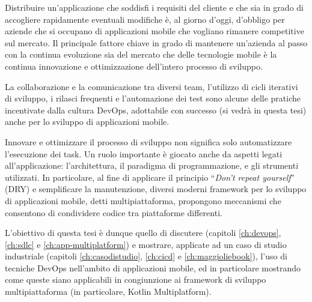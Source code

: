 
Distribuire un'applicazione che soddisfi i requisiti del cliente e che sia in grado di accogliere rapidamente eventuali modifiche è, 
al giorno d’oggi, 
d'obbligo per aziende che si occupano di applicazioni mobile che vogliano rimanere competitive sul mercato.
Il principale fattore chiave in grado di mantenere un'azienda al passo con la continua evoluzione sia del mercato che delle tecnologie mobile è la continua innovazione e ottimizzazione dell'intero processo di sviluppo.

La collaborazione e la comunicazione tra diversi team, 
l'utilizzo di cicli iterativi di sviluppo, 
i rilasci frequenti e l'automazione dei test sono alcune delle pratiche incentivate dalla cultura DevOps, 
adottabile con successo (si vedrà in questa tesi) anche per lo sviluppo di applicazioni mobile.

Innovare e ottimizzare il processo di sviluppo non significa solo automatizzare l'esecuzione dei task.
Un ruolo importante è giocato anche da aspetti legati all'applicazione:
l'architettura,
il paradigma di programmazione,
e gli strumenti utilizzati.
In particolare,
al fine di applicare il principio ``\textit{Don't repeat yourself}'' (DRY) e semplificare la manutenzione,
diversi moderni framework per lo sviluppo di applicazioni mobile,
detti multipiattaforma, 
propongono meccanismi che consentono di condividere codice tra piattaforme differenti.

L'obiettivo di questa tesi è dunque quello di discutere
(capitoli \ref{ch:devops}, \ref{ch:sdlc} e \ref{ch:app-multiplatform})
e mostrare, applicate ad un caso di studio industriale
(capitoli \ref{ch:casodistudio}, \ref{ch:cicd} e \ref{ch:maggioliebook}),
l'uso di tecniche DevOps
nell'ambito di applicazioni mobile,
ed in particolare mostrando come queste siano applicabili in congiunzione
ai framework di sviluppo multipiattaforma (in particolare, Kotlin Multiplatform).
